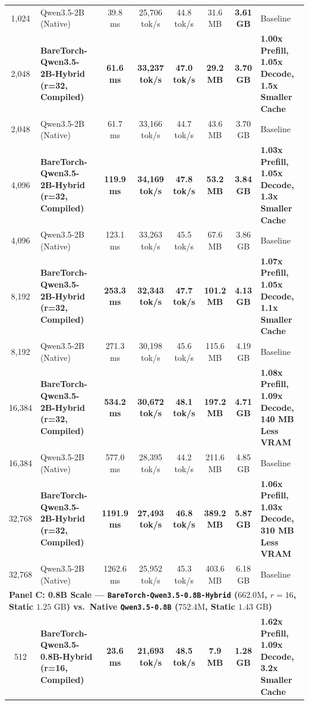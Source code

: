 \documentclass[twocolumn,10pt]{article}
\begin{document}
\begin{table}[!htbp]
{\begin{tabular}{clcccccl}
1,024 & Qwen3.5-2B (Native) & 39.8 ms & 25,706 tok/s & 44.8 tok/s & 31.6 MB & \textbf{3.61 GB} & Baseline \\
2,048 & \textbf{BareTorch-Qwen3.5-2B-Hybrid (r=32, Compiled)} & \textbf{61.6 ms} & \textbf{33,237 tok/s} & \textbf{47.0 tok/s} & \textbf{29.2 MB} & \textbf{3.70 GB} & \textbf{1.00x Prefill, 1.05x Decode, 1.5x Smaller Cache} \\
2,048 & Qwen3.5-2B (Native) & 61.7 ms & 33,166 tok/s & 44.7 tok/s & 43.6 MB & 3.70 GB & Baseline \\
4,096 & \textbf{BareTorch-Qwen3.5-2B-Hybrid (r=32, Compiled)} & \textbf{119.9 ms} & \textbf{34,169 tok/s} & \textbf{47.8 tok/s} & \textbf{53.2 MB} & \textbf{3.84 GB} & \textbf{1.03x Prefill, 1.05x Decode, 1.3x Smaller Cache} \\
4,096 & Qwen3.5-2B (Native) & 123.1 ms & 33,263 tok/s & 45.5 tok/s & 67.6 MB & 3.86 GB & Baseline \\
8,192 & \textbf{BareTorch-Qwen3.5-2B-Hybrid (r=32, Compiled)} & \textbf{253.3 ms} & \textbf{32,343 tok/s} & \textbf{47.7 tok/s} & \textbf{101.2 MB} & \textbf{4.13 GB} & \textbf{1.07x Prefill, 1.05x Decode, 1.1x Smaller Cache} \\
8,192 & Qwen3.5-2B (Native) & 271.3 ms & 30,198 tok/s & 45.6 tok/s & 115.6 MB & 4.19 GB & Baseline \\
16,384 & \textbf{BareTorch-Qwen3.5-2B-Hybrid (r=32, Compiled)} & \textbf{534.2 ms} & \textbf{30,672 tok/s} & \textbf{48.1 tok/s} & \textbf{197.2 MB} & \textbf{4.71 GB} & \textbf{1.08x Prefill, 1.09x Decode, 140 MB Less VRAM} \\
16,384 & Qwen3.5-2B (Native) & 577.0 ms & 28,395 tok/s & 44.2 tok/s & 211.6 MB & 4.85 GB & Baseline \\
32,768 & \textbf{BareTorch-Qwen3.5-2B-Hybrid (r=32, Compiled)} & \textbf{1191.9 ms} & \textbf{27,493 tok/s} & \textbf{46.8 tok/s} & \textbf{389.2 MB} & \textbf{5.87 GB} & \textbf{1.06x Prefill, 1.03x Decode, 310 MB Less VRAM} \\
32,768 & Qwen3.5-2B (Native) & 1262.6 ms & 25,952 tok/s & 45.3 tok/s & 403.6 MB & 6.18 GB & Baseline \\
\midrule
\multicolumn{8}{l}{\textbf{Panel C: 0.8B Scale --- \texttt{BareTorch-Qwen3.5-0.8B-Hybrid} ($662.0\text{M}$, $r=16$, Static $1.25\text{ GB}$) vs.\ Native \texttt{Qwen3.5-0.8B} ($752.4\text{M}$, Static $1.43\text{ GB}$)}} \\
512 & \textbf{BareTorch-Qwen3.5-0.8B-Hybrid (r=16, Compiled)} & \textbf{23.6 ms} & \textbf{21,693 tok/s} & \textbf{48.5 tok/s} & \textbf{7.9 MB} & \textbf{1.28 GB} & \textbf{1.62x Prefill, 1.09x Decode, 3.2x Smaller Cache} \\

\end{tabular}}
\end{table}
\end{document}
